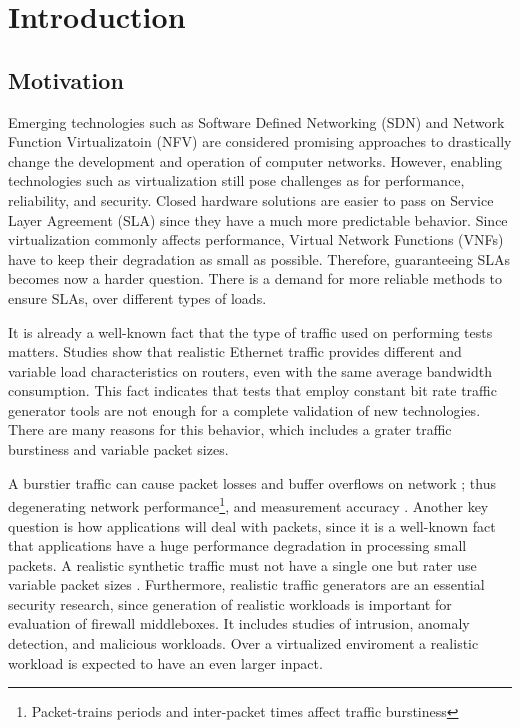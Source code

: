 \chapter{Introduction}\label{ch:introduction}

\section{Motivation}
 

Emerging technologies such as Software Defined Networking (SDN) and Network Function Virtualizatoin (NFV) are  considered promising approaches to  drastically change the development and operation of computer networks. However, enabling technologies such as virtualization still pose challenges as for performance,  reliability, and security\cite{nfv-challenges}. Closed hardware solutions are easier to pass on Service Layer Agreement (SLA) since they have a much more predictable behavior. Since virtualization commonly affects performance, Virtual Network Functions (VNFs) have to keep their degradation as small as possible. Therefore, guaranteeing SLAs becomes now a harder question. There is a demand for more reliable methods to ensure SLAs, over different types of loads.


It is already a well-known fact that the type of traffic used on performing tests matters. Studies show that  realistic Ethernet traffic provides different and variable load characteristics on routers\cite{harpoon-validation}, even with the same average bandwidth consumption. This fact indicates that tests that employ constant bit rate traffic generator tools are not enough for a complete validation of new technologies. There are many reasons for this behavior, which includes a grater traffic burstiness and variable packet sizes.


A burstier traffic can cause packet losses and buffer overflows on network \cite{burstiness-queue-lenght} \cite{modelling-of-self-similar} \cite{empirical-interarrival-study}; thus degenerating network performance\footnote{Packet-trains periods and inter-packet times affect traffic burstiness}, and  measurement accuracy\cite{legotg-paper} \cite{background-traffic-matter}. Another key question is how applications will deal with packets, since it is a well-known fact that applications have a huge performance degradation in processing small packets\cite{comparative-trafficgen-tools}. A realistic synthetic traffic must not have a single one but rater use variable packet sizes \cite{packet-distribution-model}. 
Furthermore, realistic traffic generators are an essential security research\cite{ditg-paper}, since generation of realistic workloads is important for evaluation of firewall middleboxes. It includes studies of intrusion, anomaly detection, and malicious workloads\cite{ditg-paper}. Over a virtualized enviroment a realistic workload is expected to have an even larger inpact.


